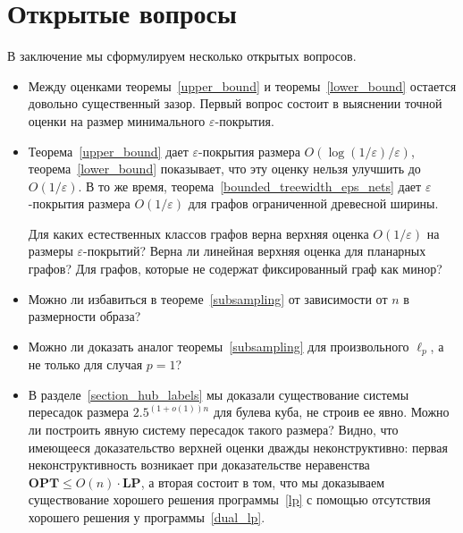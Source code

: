 \documentclass[12pt]{article}
\newcommand{\eps}{\varepsilon}
\begin{document}
    \section{Открытые вопросы}
    В заключение мы сформулируем несколько открытых вопросов.
    \begin{itemize}

        \item
        Между оценками теоремы~\ref{upper_bound} и теоремы~\ref{lower_bound} остается довольно существенный зазор.
        Первый вопрос состоит в выяснении точной оценки на размер минимального $\eps$-покрытия.

        \item
        Теорема~\ref{upper_bound} дает $\eps$-покрытия размера $O(\log(1 / \eps) / \eps)$, теорема~\ref{lower_bound}
        показывает, что эту оценку нельзя улучшить до $O(1 / \eps)$. В то же время,
        теорема~\ref{bounded_treewidth_eps_nets} дает
        $\eps$-покрытия размера $O(1 / \eps)$ для графов ограниченной древесной ширины.

        Для каких естественных классов графов верна верхняя оценка $O(1 / \eps)$ на размеры $\eps$-покрытий?
        Верна ли линейная верхняя оценка для планарных графов?
        Для графов, которые не содержат фиксированный граф как минор?
        \item
        Можно ли избавиться в теореме~\ref{subsampling} от зависимости от $n$ в размерности образа?

        \item
        Можно ли доказать аналог теоремы~\ref{subsampling} для произвольного $\ell_p$, а не только для случая $p = 1$?
        \item
        В разделе~\ref{section_hub_labels} мы доказали существование системы пересадок размера $2.5^{(1+o(1))n}$ для
        булева куба, не строив ее явно.
        Можно ли построить явную систему пересадок такого размера?
        Видно, что имеющееся доказательство верхней оценки дважды неконструктивно: первая неконструктивность возникает при доказательстве неравенства
        $\mathbf{OPT} \leq O(n) \cdot \mathbf{LP}$, а вторая состоит в том, что мы доказываем существование хорошего решения программы~\ref{lp}
        с помощью отсутствия хорошего решения у программы~\ref{dual_lp}.
    \end{itemize}
    
    
\end{document}
